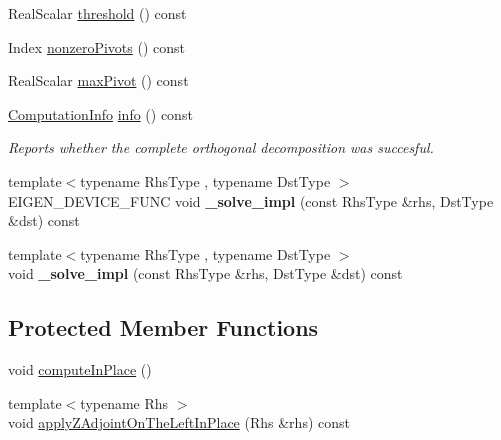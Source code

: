 \begin{DoxyCompactItemize}
\item 
Real\+Scalar \mbox{\hyperlink{class_eigen_1_1_complete_orthogonal_decomposition_a3909f07268496c0f08f1b57331d91075}{threshold}} () const
\item 
Index \mbox{\hyperlink{class_eigen_1_1_complete_orthogonal_decomposition_af9d7a5bdbc16a4a0bf7394ef0dd208da}{nonzero\+Pivots}} () const
\item 
Real\+Scalar \mbox{\hyperlink{class_eigen_1_1_complete_orthogonal_decomposition_a5b712a58c13b7e5089be9228ec42f738}{max\+Pivot}} () const
\item 
\mbox{\hyperlink{group__enums_ga85fad7b87587764e5cf6b513a9e0ee5e}{Computation\+Info}} \mbox{\hyperlink{class_eigen_1_1_complete_orthogonal_decomposition_a1f5c45f78848cfdbb96963cefbbb3274}{info}} () const
\begin{DoxyCompactList}\small\item\em Reports whether the complete orthogonal decomposition was succesful. \end{DoxyCompactList}\item 
\mbox{\label{class_eigen_1_1_complete_orthogonal_decomposition_a0b288fc8c0c84da06601d75aa5dc72fb}} 
{\footnotesize template$<$typename Rhs\+Type , typename Dst\+Type $>$ }\\E\+I\+G\+E\+N\+\_\+\+D\+E\+V\+I\+C\+E\+\_\+\+F\+U\+NC void {\bfseries \+\_\+solve\+\_\+impl} (const Rhs\+Type \&rhs, Dst\+Type \&dst) const
\item 
\mbox{\label{class_eigen_1_1_complete_orthogonal_decomposition_a6b6db285a30edd61d7ea2690062f4a93}} 
{\footnotesize template$<$typename Rhs\+Type , typename Dst\+Type $>$ }\\void {\bfseries \+\_\+solve\+\_\+impl} (const Rhs\+Type \&rhs, Dst\+Type \&dst) const
\end{DoxyCompactItemize}
\subsection*{Protected Member Functions}
\begin{DoxyCompactItemize}
\item 
void \mbox{\hyperlink{class_eigen_1_1_complete_orthogonal_decomposition_adb0b963d7d8f96492904e8eda03efbf5}{compute\+In\+Place}} ()
\item 
{\footnotesize template$<$typename Rhs $>$ }\\void \mbox{\hyperlink{class_eigen_1_1_complete_orthogonal_decomposition_a0a89641e0b4ea92c515405f2a31e6abe}{apply\+Z\+Adjoint\+On\+The\+Left\+In\+Place}} (Rhs \&rhs) const
\end{DoxyCompactItemize}
